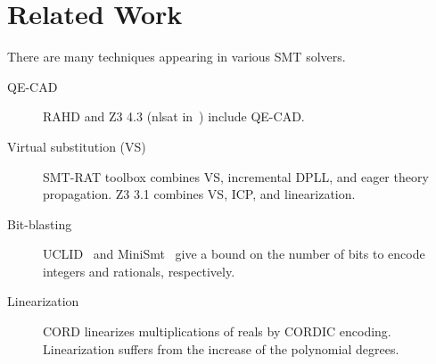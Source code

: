 \documentclass[runningheads,a4paper,oribibl]{llncs}
\newcommand{\mizuhito}[1]{\{{\bf Mizuhito:~\sf #1}\}} %
\begin{document}
\section{Related Work} \label{sec:relate}

There are many techniques appearing in various SMT solvers. 
\begin{description}
\item[QE-CAD] RAHD \cite{Passmore09combineddecision} and 
Z3 4.3 (nlsat in~\cite{Jovanovic13}) include QE-CAD. 

\item[Virtual substitution (VS)]
SMT-RAT toolbox \cite{smtrat} combines 
VS, incremental DPLL, and %
eager theory propagation. 
Z3 3.1 %
combines VS, ICP, and linearization.

\item[Bit-blasting] %
UCLID~\cite{Bryant07decidingbit-vector} and MiniSmt~\cite{Zankl:2010:SNR:1939141.1939168} give a bound on the number of bits 
to encode integers and rationals, respectively. %

\item[Linearization] %
CORD \cite{cordic} %
linearizes multiplications of reals by CORDIC encoding. 
Linearization suffers from the increase of the polynomial degrees. 
\end{description}
\end{document}
